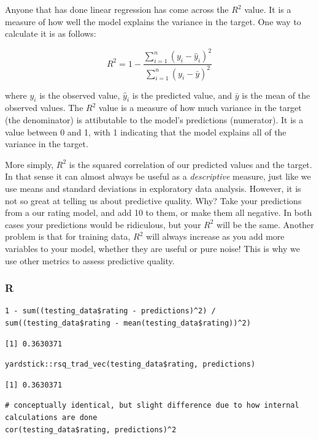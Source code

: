 \documentclass[
  letterpaper,
]{krantz}
\begin{document}
Anyone that has done linear regression has come across the \(R^2\)
value. It is a measure of how well the model explains the variance in
the target. One way to calculate it is as follows:

\[R^2 = 1 - \frac{\sum_{i=1}^{n}(y_i - \hat{y}_i)^2}{\sum_{i=1}^{n}(y_i - \bar{y})^2}\]

where \(y_i\) is the observed value, \(\hat{y}_i\) is the predicted
value, and \(\bar{y}\) is the mean of the observed values. The \(R^2\)
value is a measure of how much variance in the target (the denominator)
is attibutable to the model's predictions (numerator). It is a value
between 0 and 1, with 1 indicating that the model explains all of the
variance in the target.

More simply, \(R^2\) is the squared correlation of our predicted values
and the target. In that sense it can almost always be useful as a
\emph{descriptive} measure, just like we use means and standard
deviations in exploratory data analysis. However, it is not so great at
telling us about predictive quality. Why? Take your predictions from a
our rating model, and add 10 to them, or make them all negative. In both
cases your predictions would be ridiculous, but your \(R^2\) will be the
same. Another problem is that for training data, \(R^2\) will always
increase as you add more variables to your model, whether they are
useful or pure noise! This is why we use other metrics to assess
predictive quality.

\subsubsection{R}

\begin{verbatim}
1 - sum((testing_data$rating - predictions)^2) / sum((testing_data$rating - mean(testing_data$rating))^2)
\end{verbatim}

\begin{verbatim}
[1] 0.3630371
\end{verbatim}

\begin{verbatim}
yardstick::rsq_trad_vec(testing_data$rating, predictions)
\end{verbatim}

\begin{verbatim}
[1] 0.3630371
\end{verbatim}

\begin{verbatim}
# conceptually identical, but slight difference due to how internal calculations are done
cor(testing_data$rating, predictions)^2 
\end{verbatim}
\end{document}
